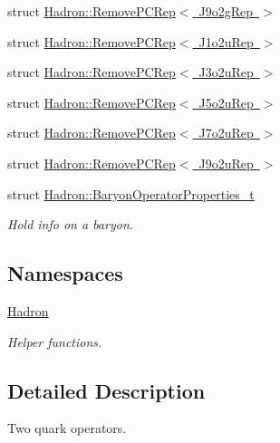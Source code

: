 \begin{DoxyCompactItemize}
struct \mbox{\hyperlink{structHadron_1_1RemovePCRep_3_01J9o2gRep_01_4}{Hadron\+::\+Remove\+P\+C\+Rep$<$ J9o2g\+Rep $>$}}
\item 
struct \mbox{\hyperlink{structHadron_1_1RemovePCRep_3_01J1o2uRep_01_4}{Hadron\+::\+Remove\+P\+C\+Rep$<$ J1o2u\+Rep $>$}}
\item 
struct \mbox{\hyperlink{structHadron_1_1RemovePCRep_3_01J3o2uRep_01_4}{Hadron\+::\+Remove\+P\+C\+Rep$<$ J3o2u\+Rep $>$}}
\item 
struct \mbox{\hyperlink{structHadron_1_1RemovePCRep_3_01J5o2uRep_01_4}{Hadron\+::\+Remove\+P\+C\+Rep$<$ J5o2u\+Rep $>$}}
\item 
struct \mbox{\hyperlink{structHadron_1_1RemovePCRep_3_01J7o2uRep_01_4}{Hadron\+::\+Remove\+P\+C\+Rep$<$ J7o2u\+Rep $>$}}
\item 
struct \mbox{\hyperlink{structHadron_1_1RemovePCRep_3_01J9o2uRep_01_4}{Hadron\+::\+Remove\+P\+C\+Rep$<$ J9o2u\+Rep $>$}}
\item 
struct \mbox{\hyperlink{structHadron_1_1BaryonOperatorProperties__t}{Hadron\+::\+Baryon\+Operator\+Properties\+\_\+t}}
\begin{DoxyCompactList}\small\item\em Hold info on a baryon. \end{DoxyCompactList}\end{DoxyCompactItemize}
\subsection*{Namespaces}
\begin{DoxyCompactItemize}
\item 
 \mbox{\hyperlink{namespaceHadron}{Hadron}}
\begin{DoxyCompactList}\small\item\em Helper functions. \end{DoxyCompactList}\end{DoxyCompactItemize}


\subsection{Detailed Description}
Two quark operators. 

